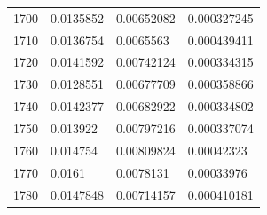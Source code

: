 \begin{center}
\begin{longtable}{l|l|l|l}
1700                                                   & 0.0135852                                                         & 0.00652082                                               & 0.000327245                                                        \\
1710                                                   & 0.0136754                                                         & 0.0065563                                                & 0.000439411                                                        \\
1720                                                   & 0.0141592                                                         & 0.00742124                                               & 0.000334315                                                        \\
1730                                                   & 0.0128551                                                         & 0.00677709                                               & 0.000358866                                                        \\
1740                                                   & 0.0142377                                                         & 0.00682922                                               & 0.000334802                                                        \\
1750                                                   & 0.013922                                                          & 0.00797216                                               & 0.000337074                                                        \\
1760                                                   & 0.014754                                                          & 0.00809824                                               & 0.00042323                                                         \\
1770                                                   & 0.0161                                                            & 0.0078131                                                & 0.00033976                                                         \\
1780                                                   & 0.0147848                                                         & 0.00714157                                               & 0.000410181                                                        \\

\end{longtable}
\end{center}

